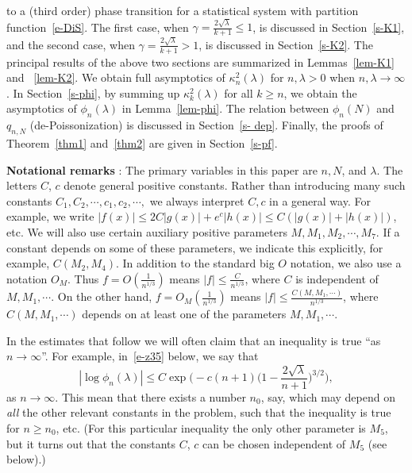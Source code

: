 \documentclass{amsart}
\theoremstyle{definition}
\theoremstyle{remark}
\numberwithin{equation}{section}
\begin{document}
to a (third order) phase transition for a statistical system 
with partition function~\eqref{e-DiS}.
The first case, when $\gamma=\frac{2\sqrt{\lambda}}{k+1}\le 1$, 
is discussed in 
Section~\ref{s-K1}, and the second case,  
when $\gamma=\frac{2\sqrt{\lambda}}{k+1}>1$, is discussed 
in Section~\ref{s-K2}.
The principal results of the above two sections are summarized in 
Lemmas~\ref{lem-K1} and ~\ref{lem-K2}. 
We obtain full asymptotics of $\kappa^2_{n}(\lambda)$ 
for $n, \lambda >0$ when $n, \lambda \to\infty$.
In Section~\ref{s-phi}, by summing up $\kappa^2_{k}(\lambda)$
for all $k\geq n$, we obtain the asymptotics of $\phi_n(\lambda)$ 
in Lemma~\ref{lem-phi}.
The relation between $\phi_n(N)$ and $q_{n,N}$ 
(de-Poissonization) is discussed in 
Section~\ref{s- dep}.
Finally, the proofs of Theorem~\ref{thm1} and~\ref{thm2} are given in 
Section~\ref{s-pf}.

\bigskip
\textbf{Notational remarks} : The primary variables in this paper are $n,N$, 
and $\lambda$. 
The letters $C$, $c$ denote general positive constants.
Rather than introducing many such constants $C_1,C_2,\cdots,c_1,c_2,\cdots,$ 
we always interpret $C,c$ in a general way. 
For example, we write $|f(x)|\le 2C|g(x)|+e^c|h(x)|\le C(|g(x)|+|h(x)|)$, etc. 
We will also use certain auxiliary positive parameters 
$M,M_1 ,M_2 ,\cdots,M_7$. 
If a constant depends on some of these parameters, we indicate 
this explicitly, for example, $C(M_2 ,M_4)$. 
In addition to the standard big $O$ notation, we also use a notation 
$O_M$. 
Thus $f=O(\frac1{n^{1/3}})$ means $|f|\le \frac{C}{n^{1/3}}$, where 
$C$ is independent of $M,M_1,\cdots$.
On the other hand, $f=O_M(\frac1{n^{1/3}})$ means 
$|f|\le \frac{C(M,M_1,\cdots)}{n^{1/3}}$, 
where $C(M,M_1,\cdots)$ depends on at least one of the parameters 
$M,M_1,\cdots$.

In the estimates that follow we will often claim that an inequality 
is true ``as $n\to\infty$''. 
For example, in~\eqref{e-z35} below, we say that 
\begin{equation*}
   |\log{\phi_n(\lambda)}| \le C\exp\biggl(-c(n+1)
\bigl(1-\frac{2\sqrt{\lambda}}{n+1}\bigr)^{3/2}\biggr),
\end{equation*}
as $n\to\infty$.
This mean that there exists a number $n_0$, say, which may 
depend on \emph{all} the other relevant constants in the problem, 
such that the inequality is true for $n\geq n_0$, etc.
(For this particular inequality the only other parameter is 
$M_5$, but it turns out that the constants $C$, $c$ can be 
chosen independent of $M_5$ (see below).)
\end{document}
